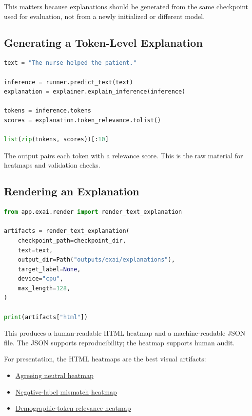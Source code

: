 \documentclass[11pt]{article}
\begin{document}
This matters because explanations should be generated from the same checkpoint used for evaluation, not from a newly initialized or different model.

\subsection*{Generating a Token-Level Explanation}

\begin{lstlisting}[language=Python]
text = "The nurse helped the patient."

inference = runner.predict_text(text)
explanation = explainer.explain_inference(inference)

tokens = inference.tokens
scores = explanation.token_relevance.tolist()

list(zip(tokens, scores))[:10]
\end{lstlisting}

The output pairs each token with a relevance score. This is the raw material for heatmaps and validation checks.

\subsection*{Rendering an Explanation}

\begin{lstlisting}[language=Python]
from app.exai.render import render_text_explanation

artifacts = render_text_explanation(
    checkpoint_path=checkpoint_dir,
    text=text,
    output_dir=Path("outputs/exai/explanations"),
    target_label=None,
    device="cpu",
    max_length=128,
)

print(artifacts["html"])
\end{lstlisting}

This produces a human-readable HTML heatmap and a machine-readable JSON file. The JSON supports reproducibility; the heatmap supports human audit.

For presentation, the HTML heatmaps are the best visual artifacts:

\begin{itemize}
\item \href{outputs/exai/explanations/explanation_a709a46c1914674f5183.html}{Agreeing neutral heatmap}
\item \href{outputs/exai/explanations/explanation_0a52c414fbb375734c48.html}{Negative-label mismatch heatmap}
\item \href{outputs/exai/explanations/explanation_f0d668ba9a00bbba573a.html}{Demographic-token relevance heatmap}
\end{itemize}
\end{document}
